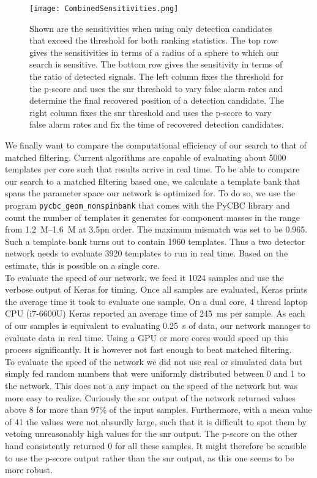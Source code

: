 \begin{figure}
\centering
\texttt{[image: CombinedSensitivities.png]}
\caption[Sensitivity of combined outputs]{Shown are the sensitivities when using only detection candidates that exceed the threshold for both ranking statistics. The top row gives the sensitivities in terms of a radius of a sphere to which our search is sensitive. The bottom row gives the sensitivity in terms of the ratio of detected signals. The left column fixes the threshold for the p-score and uses the \gls{snr} threshold to vary false alarm rates and determine the final recovered position of a detection candidate. The right column fixes the \gls{snr} threshold and uses the p-score to vary false alarm rates and fix the time of recovered detection candidates.}\label{fig:combined_sensitivities}
\end{figure}
We finally want to compare the computational efficiency of our search to that of matched filtering. Current algorithms are capable of evaluating about 5000 templates per core such that results arrive in real time. To be able to compare our search to a matched filtering based one, we calculate a template bank that spans the parameter space our network is optimized for. To do so, we use the program \verb|pycbc_geom_nonspinbank| that comes with the PyCBC library and count the number of templates it generates for component masses in the range from \SIrange{1.2}{1.6}{M_\odot} at 3.5\gls{pn} order. The maximum mismatch was set to be 0.965. Such a template bank turns out to contain 1960 templates. Thus a two detector network needs to evaluate 3920 templates to run in real time. Based on the estimate, this is possible on a single core.\\
To evaluate the speed of our network, we feed it 1024 samples and use the verbose output of Keras for timing. Once all samples are evaluated, Keras prints the average time it took to evaluate one sample. On a dual core, 4 thread laptop CPU (i7-6600U) Keras reported an average time of \SI{245}{\milli\s} per sample. As each of our samples is equivalent to evaluating \SI{0.25}{\s} of data, our network manages to evaluate data in real time. Using a GPU or more cores would speed up this process significantly. It is however not fast enough to beat matched filtering.\\
To evaluate the speed of the network we did not use real or simulated data but simply fed random numbers that were uniformly distributed between 0 and 1 to the network. This does not a any impact on the speed of the network but was more easy to realize. Curiously the \gls{snr} output of the network returned values above 8 for more than 97\% of the input samples. Furthermore, with a mean value of 41 the values were not absurdly large, such that it is difficult to spot them by vetoing unreasonably high values for the \gls{snr} output. The p-score on the other hand consistently returned 0 for all these samples. It might therefore be sensible to use the p-score output rather than the \gls{snr} output, as this one seems to be more robust.

